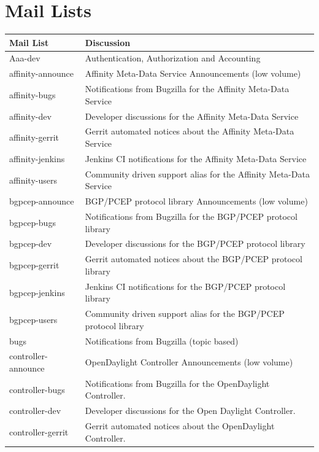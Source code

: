 \documentclass[a4paper, 12pt]{book}
\begin{document}
{\chapter{Mail Lists}
\label{chap:appendix_mail_lists}
\begin{longtable}{|p{4cm}|p{10cm}|}
\hline
\textbf{Mail List} & \textbf{Discussion} \\ \hline
Aaa-dev &	Authentication, Authorization and Accounting \\ \hline
affinity-announce &	Affinity Meta-Data Service Announcements (low volume) \\ \hline
affinity-bugs &	Notifications from Bugzilla for the Affinity Meta-Data Service \\ \hline
affinity-dev &	Developer discussions for the Affinity Meta-Data Service \\ \hline
affinity-gerrit &	Gerrit automated notices about the Affinity Meta-Data Service \\ \hline
affinity-jenkins &	Jenkins CI notifications for the Affinity Meta-Data Service \\ \hline
affinity-users &	Community driven support alias for the Affinity Meta-Data Service \\ \hline
bgpcep-announce &	BGP/PCEP protocol library Announcements (low volume) \\ \hline
bgpcep-bugs &	Notifications from Bugzilla for the BGP/PCEP protocol library \\ \hline
bgpcep-dev &	Developer discussions for the BGP/PCEP protocol library \\ \hline
bgpcep-gerrit &	Gerrit automated notices about the BGP/PCEP protocol library \\ \hline
bgpcep-jenkins &	Jenkins CI notifications for the BGP/PCEP protocol library \\ \hline
bgpcep-users &	Community driven support alias for the BGP/PCEP protocol library \\ \hline
bugs &	Notifications from Bugzilla (topic based) \\ \hline
controller-announce &	OpenDaylight Controller Announcements (low volume) \\ \hline
controller-bugs &	Notifications from Bugzilla for the OpenDaylight Controller. \\ \hline
controller-dev &	Developer discussions for the Open Daylight Controller. \\ \hline
controller-gerrit &	Gerrit automated notices about the OpenDaylight Controller. \\ \hline

\end{longtable}}
\end{document}
